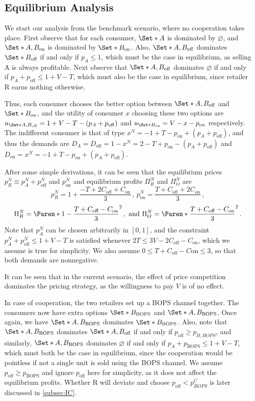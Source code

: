 \documentclass[a4paper]{article}
\theoremstyle{definition}
\theoremstyle{plain}
\theoremstyle{remark}
\newcommand{\on}{\mathrm{on}}
\newcommand{\off}{\mathrm{off}}
\newcommand{\BOPS}{\mathrm{BOPS}}
\begin{document}
\subsection{Equilibrium Analysis}\label{subsec:eq}
We start our analysis from the benchmark scenario,
where no cooperation takes place.
First observe that for each consumer,
$\Set*{A}$ is dominated by $\varnothing$,
and $\Set*{A, B_{\on}}$ is dominated by $\Set*{B_{\on}}$.
Also,
$\Set*{A,B_{\off}}$ dominates $\Set*{B_{\off}}$ if and only if $p_A\leq 1$,
which must be the case in equilibrium,
as selling A is always profitable.
Next observe that $\Set*{A,B_{\off}}$ dominates $\varnothing$ if and only if $p_A+p_{\off}\leq 1+V-T$,
which must also be the case in equilibrium,
since retailer R earns nothing otherwise.

Thus,
each consumer chooses the better option between $\Set*{A,B_{\off}}$ and $\Set*{B_{\on}}$,
and the utility of consumer $x$ choosing these two options are $u_{\Set*{A,B_{\off}}}=1+V-T-(p_A+p_{\off})$ and $u_{\Set*{B_{\on}}}=V-x-p_{\on}$ respectively.
The indifferent consumer is that of type $x^N=-1+T-p_{\on}+(p_A+p_{\off})$,
and thus the demands are $D_A=D_{\off}=1-x^N=2-T+p_{\on}-(p_A+p_{\off})$ and $D_{\on}=x^N=-1+T-p_{\on}+(p_A+p_{\off})$.

After some simple derivations,
it can be seen that the equilibrium prices $p_R^N\equiv p_A^N+p_{\off}^N$ and $p_{\on}^N$ and equilibrium profits $\Pi_R^N$ and $\Pi_O^N$ are
\[
    p_R^N=1+\frac{-T+2C_{\off}+C_{\on}}{3}\,\text{, } p_{\on}^N=\frac{T+C_{\off}+2C_{\on}}{3}\,,
\]
\[
    \Pi_R^N=\Paren*{1-\frac{T+C_{\off}-C_{\on}}{3}}^2\,,\text{ and }\Pi_O^N=\Paren*{\frac{T+C_{\off}-C_{\on}}{3}}^2\,.
\]
Note that $p_A^N$ can be chosen arbitrarily in $[0,1]$,
and the constraint $p_A^N+p_{\off}^N\leq 1+V-T$ is satisfied whenever $2T\leq 3V-2C_{\off}-C_{\on}$,
which we assume is true for simplicity.
We also assume $0\leq T+C_{\off}-C{\on}\leq 3$,
so that both demands are nonnegative.

It can be seen that in the current scenario,
the effect of price competition dominates the pricing strategy,
as the willingness to pay $V$ is of no effect.

In case of cooperation,
the two retailers set up a BOPS channel together.
The consumers now have extra options $\Set*{B_{\BOPS}}$ and $\Set*{A,B_{\BOPS}}$.
Once again,
we have $\Set*{A,B_{\BOPS}}$ dominates $\Set*{B_{\BOPS}}$.
Also,
note that $\Set*{A,B_{\BOPS}}$ dominates $\Set*{A,B_{\off}}$ if and only if $p_{\off}\geq p_{B,BOPS}$,
and similarly,
$\Set*{A,B_{\BOPS}}$ dominates $\varnothing$ if and only if $p_A+p_{\BOPS}\leq 1+V-T$,
which must both be the case in equilibrium,
since the cooperation would be pointless if not a single unit is sold using the BOPS channel.
We assume $p_{\off}\geq p_{\BOPS}$ and ignore $p_{\off}$ here for simplicity,
as it does not affect the equilibrium profits.
Whether R will deviate and choose $p_{\off}<p_{BOPS}^C$ is later discussed in \cref{subsec:IC}.
\end{document}
